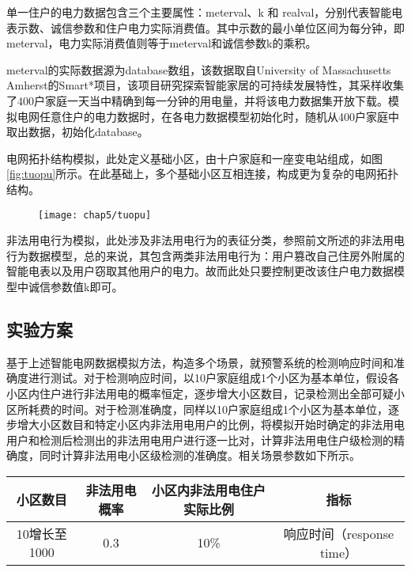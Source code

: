 单一住户的电力数据包含三个主要属性：meterval、k 和 realval，分别代表智能电表示数、诚信参数和住户电力实际消费值。其中示数的最小单位区间为每分钟，即meterval，电力实际消费值则等于meterval和诚信参数k的乘积。

meterval的实际数据源为database数组，该数据取自University of Massachusetts Amherst的Smart*项目，该项目研究探索智能家居的可持续发展特性，其采样收集了400户家庭一天当中精确到每一分钟的用电量，并将该电力数据集开放下载。模拟电网任意住户的电力数据时，在各电力数据模型初始化时，随机从400户家庭中取出数据，初始化database。

电网拓扑结构模拟，此处定义基础小区，由十户家庭和一座变电站组成，如图\ref{fig:tuopu}所示。在此基础上，多个基础小区互相连接，构成更为复杂的电网拓扑结构。

\begin{figure}[!htp]
 \centering
 \texttt{[image: chap5/tuopu]}
\end{figure}

非法用电行为模拟，此处涉及非法用电行为的表征分类，参照前文所述的非法用电行为数据模型，总的来说，其包含两类非法用电行为：用户篡改自己住房外附属的智能电表以及用户窃取其他用户的电力。故而此处只要控制更改该住户电力数据模型中诚信参数值k即可。

\subsection{实验方案}

基于上述智能电网数据模拟方法，构造多个场景，就预警系统的检测响应时间和准确度进行测试。对于检测响应时间，以10户家庭组成1个小区为基本单位，假设各小区内住户进行非法用电的概率恒定，逐步增大小区数目，记录检测出全部可疑小区所耗费的时间。对于检测准确度，同样以10户家庭组成1个小区为基本单位，逐步增大小区数目和特定小区内非法用电用户的比例，将模拟开始时确定的非法用电用户和检测后检测出的非法用电用户进行逐一比对，计算非法用电住户级检测的精确度，同时计算非法用电小区级检测的准确度。相关场景参数如下所示。

\begin{table}[!hpb]
  \centering
  \begin{tabular}{|c|c|c|c|}
  \hline
  小区数目 & 非法用电概率 & 小区内非法用电住户实际比例 & 指标\\
  \hline
  10增长至1000 & 0.3 & 10\% & 响应时间（response time）\\
  \hline
  \end{tabular}
\end{table}

